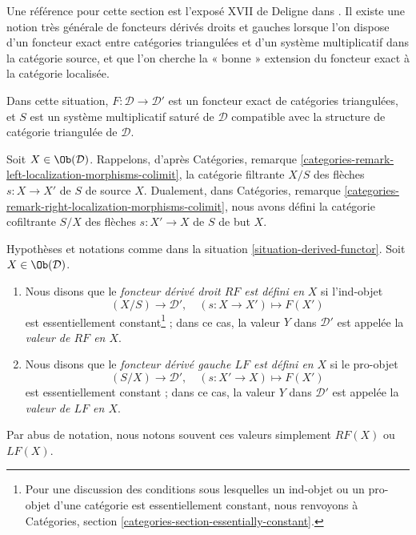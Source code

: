 \noindent
Une référence pour cette section est l'exposé XVII de Deligne dans
\cite{SGA4}. Il existe une notion très générale de foncteurs dérivés droits et
gauches lorsque l'on dispose d'un foncteur exact entre catégories triangulées
et d'un système multiplicatif dans la catégorie source, et que l'on cherche la
« bonne » extension du foncteur exact à la catégorie localisée.

\begin{situation}
\label{situation-derived-functor}
Dans cette situation, $F : \mathcal{D} \to \mathcal{D}'$ est un foncteur exact
de catégories triangulées, et $S$ est un système multiplicatif saturé de
$\mathcal{D}$ compatible avec la structure de catégorie triangulée de
$\mathcal{D}$.
\end{situation}

\noindent
Soit $X \in \Ob(\mathcal{D})$. Rappelons, d'après Catégories, remarque
\ref{categories-remark-left-localization-morphisms-colimit}, la catégorie
filtrante $X/S$ des flèches $s : X \to X'$ de $S$ de source $X$.
Dualement, dans Catégories, remarque
\ref{categories-remark-right-localization-morphisms-colimit}, nous avons défini
la catégorie cofiltrante $S/X$ des flèches $s : X' \to X$ de $S$ de but $X$.

\begin{definition}
\label{definition-right-derived-functor-defined}
Hypothèses et notations comme dans la
situation \ref{situation-derived-functor}. Soit $X \in \Ob(\mathcal{D})$.
\begin{enumerate}
\item Nous disons que le {\it foncteur dérivé droit $RF$ est défini en} $X$
si l'ind-objet
$$
(X/S) \longrightarrow \mathcal{D}', \quad
(s : X \to X') \longmapsto F(X')
$$
est essentiellement constant\footnote{Pour une discussion des conditions sous
lesquelles un ind-objet ou un pro-objet d'une catégorie est essentiellement
constant, nous renvoyons à Catégories, section
\ref{categories-section-essentially-constant}.} ; dans ce cas, la valeur $Y$
dans $\mathcal{D}'$ est appelée la {\it valeur de $RF$ en $X$}.
\item Nous disons que le {\it foncteur dérivé gauche $LF$ est défini en} $X$
si le pro-objet
$$
(S/X) \longrightarrow \mathcal{D}', \quad
(s: X' \to X) \longmapsto F(X')
$$
est essentiellement constant ; dans ce cas, la valeur $Y$ dans
$\mathcal{D}'$ est appelée la {\it valeur de $LF$ en $X$}.
\end{enumerate}
Par abus de notation, nous notons souvent ces valeurs simplement $RF(X)$ ou
$LF(X)$.
\end{definition}


